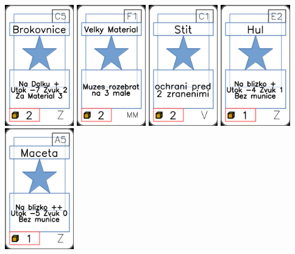 \documentclass[a4paper]{article}
\begin{document}
	\includegraphics[width=3.0cm]{img-1_104}
	\includegraphics[width=3.0cm]{img-1_55}
	\includegraphics[width=3.0cm]{img-1_70}
	\includegraphics[width=3.0cm]{img-1_81}
	\includegraphics[width=3.0cm]{img-1_94}
\end{document}
